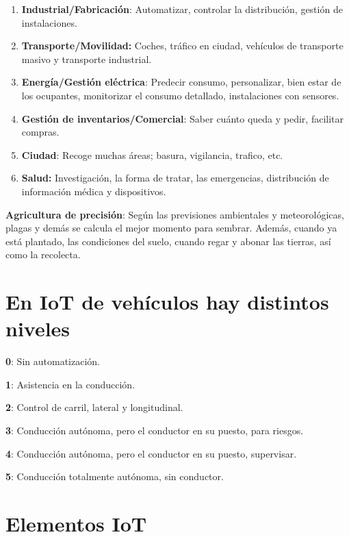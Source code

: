\documentclass[12pt]{report} %
\begin{document}
\begin{enumerate}
\def\labelenumi{\arabic{enumi}.}

\item
  \textbf{Industrial/Fabricación}: Automatizar, controlar la
  distribución, gestión de instalaciones.
\item
  \textbf{Transporte/Movilidad:} Coches, tráfico en ciudad, vehículos de
  transporte masivo y transporte industrial.
\item
  \textbf{Energía/Gestión eléctrica}: Predecir consumo, personalizar,
  bien estar de los ocupantes, monitorizar el consumo detallado,
  instalaciones con sensores.
\item
  \textbf{Gestión de inventarios/Comercial}: Saber cuánto queda y pedir,
  facilitar compras.
\item
  \textbf{Ciudad}: Recoge muchas áreas; basura, vigilancia, trafico,
  etc.
\item
  \textbf{Salud:} Investigación, la forma de tratar, las emergencias,
  distribución de información médica y dispositivos.
\end{enumerate}

\textbf{Agricultura de precisión}: Según las previsiones ambientales y
meteorológicas, plagas y demás se calcula el mejor momento para sembrar.
Además, cuando ya está plantado, las condiciones del suelo, cuando regar
y abonar las tierras, así como la recolecta.

\newpage

\section{En IoT de vehículos hay distintos
niveles}

\textbf{0}: Sin automatización.

\textbf{1}: Asistencia en la conducción.

\textbf{2}: Control de carril, lateral y longitudinal.

\textbf{3}: Conducción autónoma, pero el conductor en su puesto, para
riesgos.

\textbf{4}: Conducción autónoma, pero el conductor en su puesto,
supervisar.

\textbf{5}: Conducción totalmente autónoma, sin conductor.

\section{Elementos IoT}
\end{document}
